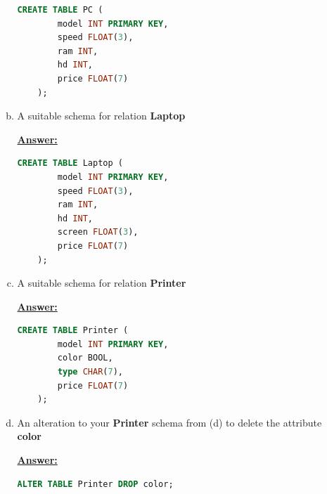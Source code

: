 \documentclass[12pt]{article}
\begin{document}
\begin{enumerate}[1.]
\begin{enumerate}[a)]
\begin{mdframed}
            \bigskip

    \begin{lstlisting}[language=SQL]
    CREATE TABLE PC (
        model INT PRIMARY KEY,
        speed FLOAT(3),
        ram INT,
        hd INT,
        price FLOAT(7)
    );
    \end{lstlisting}

        \end{mdframed}


        \item A suitable schema for relation \textbf{Laptop}

        \begin{mdframed}
            \underline{\textbf{Answer:}}

            \bigskip

    \begin{lstlisting}[language=SQL]
    CREATE TABLE Laptop (
        model INT PRIMARY KEY,
        speed FLOAT(3),
        ram INT,
        hd INT,
        screen FLOAT(3),
        price FLOAT(7)
    );
    \end{lstlisting}

        \end{mdframed}

        \item A suitable schema for relation \textbf{Printer}

        \begin{mdframed}
            \underline{\textbf{Answer:}}

            \bigskip

    \begin{lstlisting}[language=SQL]
    CREATE TABLE Printer (
        model INT PRIMARY KEY,
        color BOOL,
        type CHAR(7),
        price FLOAT(7)
    );
    \end{lstlisting}

        \end{mdframed}

        \item An alteration to your \textbf{Printer} schema from (d) to delete
        the attribute \textbf{color}

        \begin{mdframed}
            \underline{\textbf{Answer:}}

            \bigskip

    \begin{lstlisting}[language=SQL]
    ALTER TABLE Printer DROP color;
    \end{lstlisting}


\end{mdframed}
\end{enumerate}
\end{enumerate}
\end{document}
